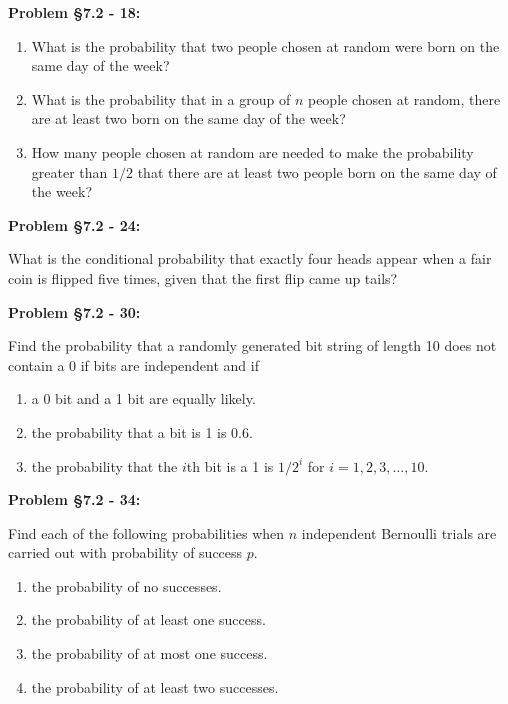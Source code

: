 \documentclass{article}
\newenvironment{problem}[1]
    {\begin{mdframed}[default]
    \textbf{Problem #1:}
    }
    {\end{mdframed}
    }
\begin{document}
\begin{problem}{\S 7.2 - 18}
\begin{enumerate}
    \item[(a)] What is the probability that two people chosen at random were born on the same day of the week?
    \item[(b)] What is the probability that in a group of $n$ people chosen at random, there are at least two born on the same day of the week?
    \item[(c)] How many people chosen at random are needed to make the probability greater than $1/2$ that there are at least two people born on the same day of the week?
\end{enumerate}
\end{problem}

\begin{problem}{\S 7.2 - 24}
What is the conditional probability that exactly four heads appear when a fair coin is flipped five times, given that the first flip came up tails?
\end{problem}

\begin{problem}{\S 7.2 - 30}
Find the probability that a randomly generated bit string of length 10 does not contain a 0 if bits are independent and if
\begin{enumerate}
    \item[(a)] a 0 bit and a 1 bit are equally likely.
    \item[(b)] the probability that a bit is 1 is 0.6.
    \item[(c)] the probability that the $i$th bit is a 1 is $1/2^i$ for $i = 1, 2, 3, \dots, 10$.
\end{enumerate}
\end{problem}

\begin{problem}{\S 7.2 - 34}
Find each of the following probabilities when $n$ independent Bernoulli trials are carried out with probability of success $p$.
\begin{enumerate}
    \item[(a)] the probability of no successes.
    \item[(b)] the probability of at least one success.
    \item[(c)] the probability of at most one success.
    \item[(d)] the probability of at least two successes.
\end{enumerate}
\end{problem}
\end{document}
